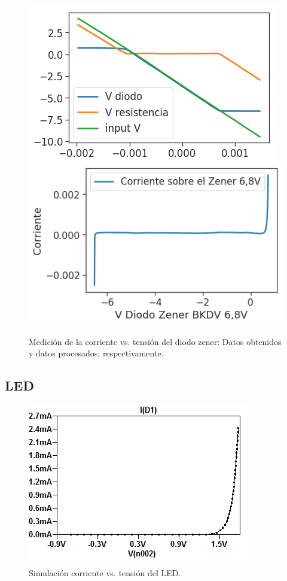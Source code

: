 \begin{figure}[H]
\centering
\includegraphics[scale=0.5]{../EJ1/DiodoZener/datosOsciloscopioZener}
\includegraphics[scale=0.5]{../EJ1/DiodoZener/zenerMedido}
\caption{Medici\'on de la corriente vs. tensi\'on del diodo zener: Datos obtenidos y datos procesados; respectivamente.}
\label{med2b}
\end{figure}


\subsection*{\color{orange}LED}

\begin{figure}[H]
\centering
\includegraphics[scale=0.62]{../EJ1/LED/LEDsimulado}
\caption{Simulaci\'on corriente vs. tensi\'on del LED.}
\label{med3a}
\end{figure}

